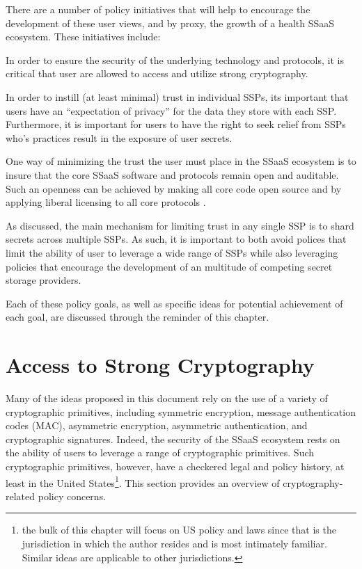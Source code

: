 There are a number of policy initiatives that will help to encourage
the development of these user views, and by proxy, the growth of a
health SSaaS ecosystem. These initiatives include:

\begin{packed_desc}
\item[Access to Strong Cryptography:] In order to ensure the security
  of the underlying technology and protocols, it is critical that user
  are allowed to access and utilize strong cryptography.
\item[SSP Privacy and Security:] In order to instill (at least
  minimal) trust in individual SSPs, its important that users have an
  ``expectation of privacy'' for the data they store with each
  SSP. Furthermore, it is important for users to have the right to
  seek relief from SSPs who's practices result in the exposure of user
  secrets.
\item[Openness and Transparency:] One way of minimizing the trust the
  user must place in the SSaaS ecosystem is to insure that the core
  SSaaS software and protocols remain open and auditable. Such an
  openness can be achieved by making all core code open source and by
  applying liberal licensing to all core protocols .
\item[Use of Multiple SSPs:] As discussed, the main mechanism for
  limiting trust in any single SSP is to shard secrets across multiple
  SSPs. As such, it is important to both avoid polices that limit the
  ability of user to leverage a wide range of SSPs while also
  leveraging policies that encourage the development of an multitude
  of competing secret storage providers.
\end{packed_desc}

Each of these policy goals, as well as specific ideas for potential
achievement of each goal, are discussed through the reminder of this
chapter.

\section{Access to Strong Cryptography}
\label{chap:policy:crypto}

Many of the ideas proposed in this document rely on the use of a
variety of cryptographic primitives, including symmetric encryption,
message authentication codes (MAC), asymmetric encryption, asymmetric
authentication, and cryptographic signatures. Indeed, the security of
the SSaaS ecosystem rests on the ability of users to leverage a range
of cryptographic primitives. Such cryptographic primitives, however,
have a checkered legal and policy history, at least in the United
States\footnote{the bulk of this chapter will focus on US policy and
  laws since that is the jurisdiction in which the author resides and
  is most intimately familiar. Similar ideas are applicable to other
  jurisdictions.}. This section provides an overview of
cryptography-related policy concerns.

